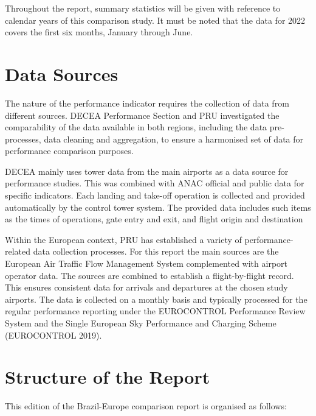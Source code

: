 \documentclass[
  a4paper,
  DIV=11,
  numbers=noendperiod]{scrreprt}
\begin{document}
Throughout the report, summary statistics will be given with reference
to calendar years of this comparison study. It must be noted that the
data for 2022 covers the first six months, January through June.

\hypertarget{data-sources}{%
\section{Data Sources}\label{data-sources}}

The nature of the performance indicator requires the collection of data
from different sources. DECEA Performance Section and PRU investigated
the comparability of the data available in both regions, including the
data pre-processes, data cleaning and aggregation, to ensure a
harmonised set of data for performance comparison purposes.

DECEA mainly uses tower data from the main airports as a data source for
performance studies. This was combined with ANAC official and public
data for specific indicators. Each landing and take-off operation is
collected and provided automatically by the control tower system. The
provided data includes such items as the times of operations, gate entry
and exit, and flight origin and destination

Within the European context, PRU has established a variety of
performance-related data collection processes. For this report the main
sources are the European Air Traffic Flow Management System complemented
with airport operator data. The sources are combined to establish a
flight-by-flight record. This ensures consistent data for arrivals and
departures at the chosen study airports. The data is collected on a
monthly basis and typically processed for the regular performance
reporting under the EUROCONTROL Performance Review System and the Single
European Sky Performance and Charging Scheme (EUROCONTROL 2019).

\hypertarget{structure-of-the-report}{%
\section{Structure of the Report}\label{structure-of-the-report}}

This edition of the Brazil-Europe comparison report is organised as
follows:
\end{document}
